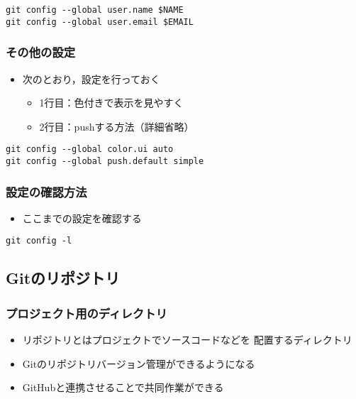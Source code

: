 \documentclass[a4paper,twoside,twocolumn]{bxjsarticle}
\begin{document}
\begin{verbatim}
git config --global user.name $NAME
git config --global user.email $EMAIL
\end{verbatim}

\subsubsection{その他の設定}
\label{sec-1-1-3}
\begin{itemize}
\item 次のとおり，設定を行っておく
\begin{itemize}
\item 1行目：色付きで表示を見やすく
\item 2行目：pushする方法（詳細省略）
\end{itemize}
\end{itemize}

\begin{verbatim}
git config --global color.ui auto
git config --global push.default simple
\end{verbatim}

\subsubsection{設定の確認方法}
\label{sec-1-1-4}
\begin{itemize}
\item ここまでの設定を確認する
\end{itemize}

\begin{verbatim}
git config -l
\end{verbatim}

\subsection{Gitのリポジトリ}
\label{sec-1-2}
\subsubsection{プロジェクト用のディレクトリ}
\label{sec-1-2-1}
\begin{itemize}
\item リポジトリとはプロジェクトでソースコードなどを
配置するディレクトリ
\item Gitのリポジトリバージョン管理ができるようになる
\item GitHubと連携させることで共同作業ができる
\end{itemize}
\end{document}
